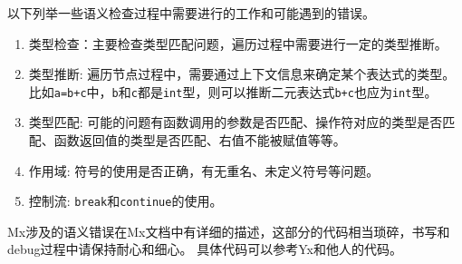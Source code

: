 以下列举一些语义检查过程中需要进行的工作和可能遇到的错误。

\begin{enumerate}
    \item 类型检查：主要检查类型匹配问题，遍历过程中需要进行一定的类型推断。
    \item 类型推断: 遍历节点过程中，需要通过上下文信息来确定某个表达式的类型。比如\texttt{a=b+c}中，\texttt{b}和\texttt{c}都是\texttt{int}型，则可以推断二元表达式\texttt{b+c}也应为\texttt{int}型。
    \item 类型匹配: 可能的问题有函数调用的参数是否匹配、操作符对应的类型是否匹配、函数返回值的类型是否匹配、右值不能被赋值等等。
    \item 作用域: 符号的使用是否正确，有无重名、未定义符号等问题。
    \item 控制流: \texttt{break}和\texttt{continue}的使用。
\end{enumerate}


Mx涉及的语义错误在Mx文档中有详细的描述，这部分的代码相当琐碎，书写和debug过程中请保持耐心和细心。
具体代码可以参考Yx和他人的代码。


